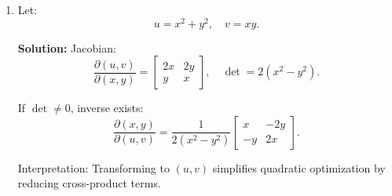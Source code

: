 \documentclass[12pt]{article}
\begin{document}
\begin{enumerate}
So:
\[
\frac{\partial(x,y,z)}{\partial \theta} = J^{-1}
\begin{bmatrix}
1 \\ 0 \\ 0
\end{bmatrix}.
\]

By Cramer’s rule, these are ratios of determinants. Exact values depend on $(x,y,z)$, but the method shows how $\theta$ shifts propagate.



\item
Let:
\[
u = x^2 + y^2, \quad v = xy.
\]

\textbf{Solution:}  
Jacobian:
\[
\frac{\partial(u,v)}{\partial(x,y)} =
\begin{bmatrix}
2x & 2y \\
y & x
\end{bmatrix}, \quad
\det = 2(x^2 - y^2).
\]

If $\det \neq 0$, inverse exists:
\[
\frac{\partial(x,y)}{\partial(u,v)} =
\frac{1}{2(x^2 - y^2)}
\begin{bmatrix}
x & -2y \\
-y & 2x
\end{bmatrix}.
\]

Interpretation: Transforming to $(u,v)$ simplifies quadratic optimization by reducing cross-product terms.

\end{enumerate}
\end{document}
